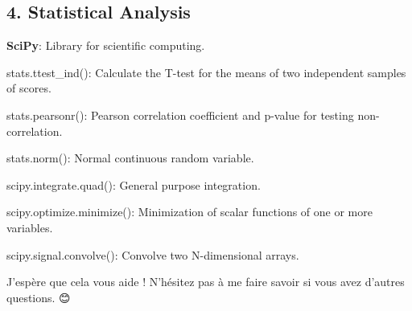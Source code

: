 \subsection*{4. Statistical Analysis}


\begin{DoxyItemize}
\item {\bfseries Sci\+Py}\+: Library for scientific computing.
\begin{DoxyItemize}
\item {\ttfamily stats.\+ttest\+\_\+ind()}\+: Calculate the T-\/test for the means of two independent samples of scores.
\item {\ttfamily stats.\+pearsonr()}\+: Pearson correlation coefficient and p-\/value for testing non-\/correlation.
\item {\ttfamily stats.\+norm()}\+: Normal continuous random variable.
\item {\ttfamily scipy.\+integrate.\+quad()}\+: General purpose integration.
\item {\ttfamily scipy.\+optimize.\+minimize()}\+: Minimization of scalar functions of one or more variables.
\item {\ttfamily scipy.\+signal.\+convolve()}\+: Convolve two N-\/dimensional arrays.
\end{DoxyItemize}
\end{DoxyItemize}

J’espère que cela vous aide ! N’hésitez pas à me faire savoir si vous avez d’autres questions. 😊 